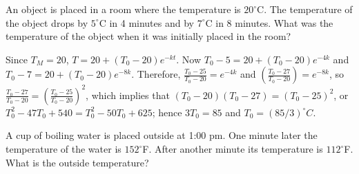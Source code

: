 \documentclass{ximera}
\begin{document}
\begin{problem}\label{exer:4.2.6}
An object is placed in a room where the temperature is
$20^\circ$C.  The temperature of the object drops by
$5^\circ$C in 4 minutes and by $7^\circ$C in 8 minutes.
What was the temperature of the object when it was initially
placed in the room?

\begin{solution}
Since $T_M=20$, $T=20+(T_0-20)e^{-kt}$. Now
$T_0-5=20+(T_0-20)e^{-4k}$  and $T_0-7=20+(T_0-20)e^{-8k}$. Therefore,
$\frac{T_0-25}{T_0-20}=e^{-4k}$ and $\left(\frac{T_0-27}{T_0-20}\right)=e^{-8k}$, so  $\frac{T_0-27}{T_0-20}=\left(\frac{T_0-25}{T_0-20}\right)^2$,
which implies that $(T_0-20)(T_0-27)=(T_0-25)^2$, or
$T_0^2-47T_0+540=T_0^2-50T_0+625$; hence $3T_0=85$
and  $T_0={(85/3)^\circ C}$.
\end{solution}
\end{problem}

\begin{problem}\label{exer:4.2.7}
A cup of boiling water is placed outside at 1:00 {\sc pm}.  One
minute later the temperature of the water is $152^\circ$F.
After another minute its temperature is $112^\circ$F.  What
is the outside temperature?
\end{problem}
\end{document}

